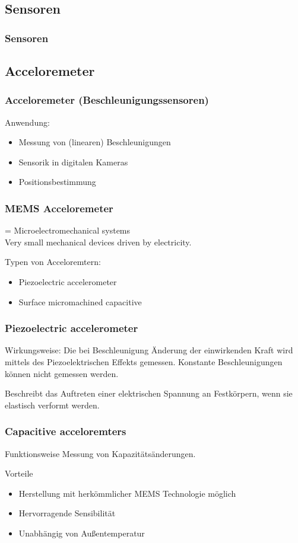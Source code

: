 \documentclass[10pt,a4paper,oneside]{beamer}
\begin{document}
\begin{frame}
  \section{Sensoren}
  \frametitle{Sensoren}
\end{frame}

\begin{frame}
  \subsection{Acceloremeter}
  \frametitle{Acceloremeter (Beschleunigungssensoren)}
  
  Anwendung:
  \begin{itemize}
    \item Messung von (linearen) Beschleunigungen
  	\item Sensorik in digitalen Kameras
  	\item Positionsbestimmung
  \end{itemize}
\end{frame}

\begin{frame}
  \frametitle{MEMS Acceloremeter}
  
  \begin{definition}[MEMS]
  = Microelectromechanical systems \\
  Very small mechanical devices driven by electricity.
  \end{definition}
   Typen von Acceloremtern:
  \begin{itemize}
    \item Piezoelectric accelerometer
  	\item Surface micromachined capacitive
  \end{itemize}
\end{frame}

\begin{frame}
  \frametitle{Piezoelectric accelerometer}
  Wirkungsweise: Die bei Beschleunigung Änderung der einwirkenden Kraft wird mittels des Piezoelektrischen Effekts gemessen.
  Konstante Beschleunigungen können nicht gemessen werden.
    \bigskip
    \begin{definition}[Piezoelektrizität]
  Beschreibt das Auftreten einer elektrischen Spannung an Festkörpern, wenn sie elastisch verformt werden.
  \end{definition}
\end{frame}

\begin{frame}
	\frametitle{Capacitive acceloremters}
	\begin{block}{Funktionsweise}
		Messung von Kapazitätsänderungen.
	\end{block}

    \bigskip
	Vorteile
 	\begin{itemize}
 		\item Herstellung mit herkömmlicher MEMS Technologie möglich
 		\item Hervorragende Sensibilität
		\item Unabhängig von Außentemperatur
 	\end{itemize}
\end{frame}
\end{document}
